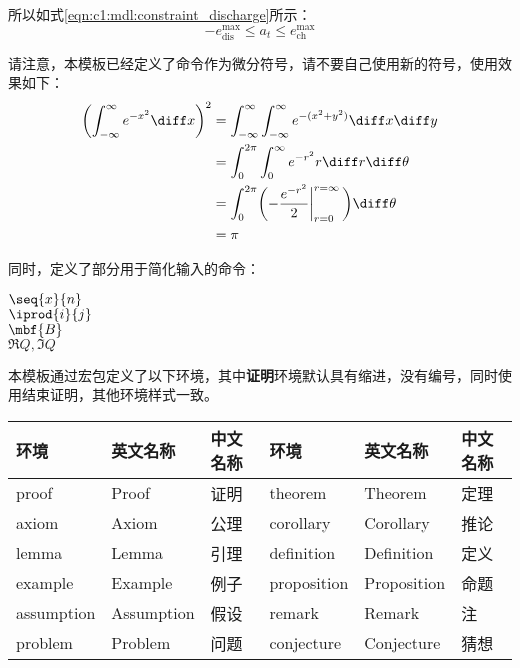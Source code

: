 所以如式\eqref{eqn:c1:mdl:constraint_discharge}所示：
\begin{equation}
    -e^{\max}_\text{dis} \leq a_t \leq e^{\max}_\text{ch}
\end{equation}

请注意，本模板已经定义了\clist{\diff}命令作为微分符号，请不要自己使用新的符号，使用效果如下：
\begin{align}\label{eqn:c1:diff}
  \biggl(\int_{-\infty}^\infty e^{-x^2}\diff x\biggr)^2 
    &= \int_{-\infty}^\infty\int_{-\infty}^\infty e^{-(x^2+y^2)}\diff x\diff y \\
    &= \int_0^{2\pi}\int_0^\infty e^{-r^2}r\diff r\diff\theta \\
    &= \int_0^{2\pi}\biggl(-{e^{-r^2}\over2}\bigg\vert_{r=0}^{r=\infty}\,\biggr)\diff\theta \\
    &= \pi
\end{align}


同时，定义了部分用于简化输入的命令：

\begin{texcode}[sidebyside]{}
  $\seq{x}{n}$ \\ %
  $\iprod{i}{j}$ \\ %
  $\mbf{B}$ \\ %
  $\Re{Q},\Im{Q}$
\end{texcode}

\clearpage


本模板通过宏包定义了以下环境，其中\textbf{证明}环境默认具有缩进，没有编号，同时使用\clist{\qedhere}结束证明，其他环境样式一致。

\begin{table}[H]
  \begin{tabularx}{\textwidth}{YYY|YYY}
  \toprule
    环境 & 英文名称 & 中文名称 & 环境 & 英文名称 & 中文名称 \\
  \midrule
    proof & Proof & 证明 & theorem & Theorem & 定理 \\
    axiom & Axiom & 公理 & corollary & Corollary & 推论 \\
    lemma & Lemma & 引理 & definition & Definition & 定义 \\
    example & Example & 例子 & proposition & Proposition & 命题 \\
    assumption & Assumption & 假设 & remark & Remark & 注 \\
    problem & Problem & 问题 & conjecture & Conjecture & 猜想 \\
  \bottomrule
  \end{tabularx}
\end{table}



